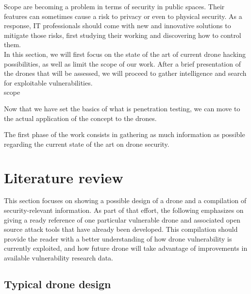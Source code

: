 \begin{chaptercover}{Scope}%
{
{\large \hyphenation{} \vspace{-.5cm}  are becoming a problem in terms of security in public spaces. Their features can sometimes cause a risk to privacy or even to physical security. As a response, IT professionals should come with new and innovative solutions to mitigate those risks, first studying their working and discovering how to control them. \newline \\ In this section, we will first focus on the state of the art of current drone hacking possibilities, as well as limit the scope of our work. After a brief presentation of the drones that will be assessed, we will proceed to gather intelligence and search for exploitable vulnerabilities. \newline\\}}%
{scope}

Now that we have set the basics of what is penetration testing, we can move to the actual application of the concept to the drones. 

The first phase of the work consists in gathering as much information as possible regarding the current state of the art on drone security.

\section{Literature review}

This section focuses on showing a possible design of a drone and a compilation of security-relevant information. As part of that effort, the following emphasizes on giving a ready reference of one particular vulnerable drone and associated open source attack tools that have already been developed. This compilation should provide the reader with a better understanding of how drone vulnerability is currently exploited, and how future drone will take advantage of improvements in available vulnerability research data.

\subsection{Typical drone design}\label{subsec:typical-drone-design}


\end{chaptercover}
